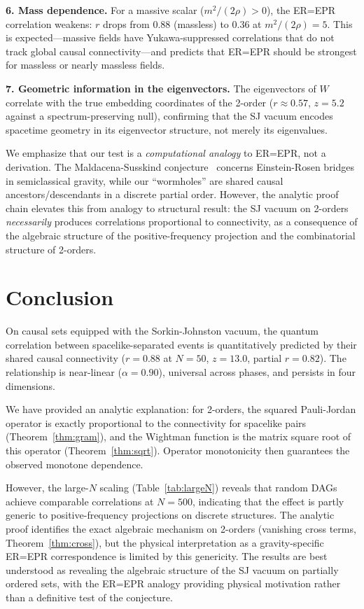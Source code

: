 \documentclass[aps,prd,twocolumn,superscriptaddress,nofootinbib]{revtex4-2}
\begin{document}
\textbf{6. Mass dependence.} For a massive scalar ($m^2/(2\rho) > 0$), the ER=EPR correlation weakens: $r$ drops from $0.88$ (massless) to $0.36$ at $m^2/(2\rho) = 5$. This is expected---massive fields have Yukawa-suppressed correlations that do not track global causal connectivity---and predicts that ER=EPR should be strongest for massless or nearly massless fields.

\textbf{7. Geometric information in the eigenvectors.} The eigenvectors of $W$ correlate with the true embedding coordinates of the 2-order ($r \approx 0.57$, $z = 5.2$ against a spectrum-preserving null), confirming that the SJ vacuum encodes spacetime geometry in its eigenvector structure, not merely its eigenvalues.

We emphasize that our test is a \emph{computational analogy} to ER=EPR, not a derivation. The Maldacena-Susskind conjecture~\cite{maldacena2013} concerns Einstein-Rosen bridges in semiclassical gravity, while our ``wormholes'' are shared causal ancestors/descendants in a discrete partial order. However, the analytic proof chain elevates this from analogy to structural result: the SJ vacuum on 2-orders \emph{necessarily} produces correlations proportional to connectivity, as a consequence of the algebraic structure of the positive-frequency projection and the combinatorial structure of 2-orders.

\section{Conclusion}

On causal sets equipped with the Sorkin-Johnston vacuum, the quantum correlation between spacelike-separated events is quantitatively predicted by their shared causal connectivity ($r = 0.88$ at $N = 50$, $z = 13.0$, partial $r = 0.82$). The relationship is near-linear ($\alpha = 0.90$), universal across phases, and persists in four dimensions.

We have provided an analytic explanation: for 2-orders, the squared Pauli-Jordan operator is exactly proportional to the connectivity for spacelike pairs (Theorem~\ref{thm:gram}), and the Wightman function is the matrix square root of this operator (Theorem~\ref{thm:sqrt}). Operator monotonicity then guarantees the observed monotone dependence.

However, the large-$N$ scaling (Table~\ref{tab:largeN}) reveals that random DAGs achieve comparable correlations at $N = 500$, indicating that the effect is partly generic to positive-frequency projections on discrete structures. The analytic proof identifies the exact algebraic mechanism on 2-orders (vanishing cross terms, Theorem~\ref{thm:cross}), but the physical interpretation as a gravity-specific ER=EPR correspondence is limited by this genericity. The results are best understood as revealing the algebraic structure of the SJ vacuum on partially ordered sets, with the ER=EPR analogy providing physical motivation rather than a definitive test of the conjecture.
\end{document}
